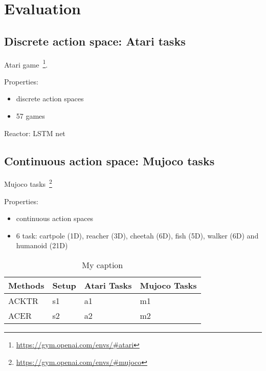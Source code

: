 \section{Evaluation}

\subsection{Discrete action space: Atari tasks}
Atari game~\footnote{\url{https://gym.openai.com/envs/\#atari}}.

Properties:
\begin{itemize}
\item discrete action spaces
\item 57 games
\end{itemize}

Reactor: LSTM net

\subsection{Continuous action space: Mujoco tasks}
Mujoco tasks~\footnote{\url{https://gym.openai.com/envs/\#mujoco}}

Properties:
\begin{itemize}
\item continuous action spaces
\item 6 task: cartpole (1D), reacher (3D), cheetah (6D), fish (5D), walker (6D) and humanoid (21D)
\end{itemize}

\begin{table}[]
\centering
\caption{My caption}
\label{my-label}

\begin{tabular}{|l|l|l|l|}
\hline
Methods & Setup & Atari Tasks & Mujoco Tasks \\ \hline
ACKTR   & s1    & a1          & m1           \\ \hline
ACER    & s2    & a2          & m2           \\ \hline
\end{tabular}

\end{table}
